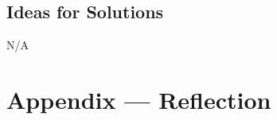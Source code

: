 \documentclass[12pt, titlepage]{article}
\begin{document}
\subsection{Ideas for Solutions}

N/A

\newpage


\section{Appendix --- Reflection}


\end{document}
